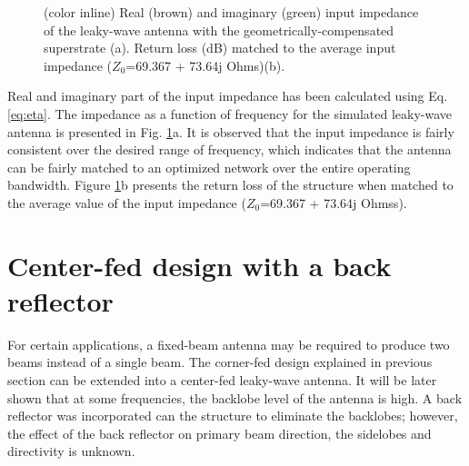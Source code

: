 \begin{figure} [t!]
\centering
  \noindent
\hspace*{\fill}%
	\noindent
\hspace*{\fill}%
\mbox{\subfloat[] {}}
\hspace*{\fill}%
\mbox{\subfloat[] {}}
\hspace*{\fill}%
  \caption[Input impedance and the return loss of the geometrically compensated leaky-wave antenna.]{(color inline) Real (brown) and imaginary (green) input impedance of the leaky-wave antenna with the geometrically-compensated superstrate (a). Return loss (dB) matched to the average input impedance ($Z_0$=69.367 + 73.64j Ohms)(b). }
\label{fig:inimp}
\end{figure}

Real and imaginary part of the input impedance has been calculated using Eq. \ref{eq:eta}. The impedance as a function of frequency for the simulated leaky-wave antenna is presented in Fig. \ref{fig:inimp}a. It is observed that the input impedance is fairly consistent over the desired range of frequency, which indicates that the antenna can be fairly matched to an optimized network over the entire operating bandwidth. Figure \ref{fig:inimp}b presents the return loss of the structure when matched to the average value of the input impedance ($Z_0$=69.367 + 73.64j Ohmss).


\section{Center-fed design with a back reflector}

For certain applications, a fixed-beam antenna may be required to produce two beams instead of a single beam. The corner-fed design explained in previous section can be extended into a center-fed leaky-wave antenna. It will be later shown that at some frequencies, the backlobe level of the antenna is high. A back reflector was incorporated can the structure to eliminate the backlobes; however, the effect of the back reflector on primary beam direction, the sidelobes and directivity is unknown. 

